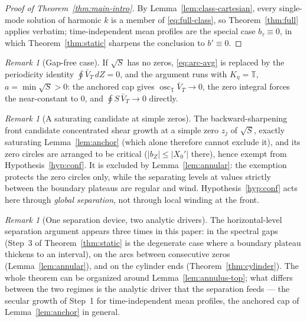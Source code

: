 \documentclass[11pt]{amsart}
\theoremstyle{definition}
\theoremstyle{remark}
\newtheorem{remark}[theorem]{Remark}
\newcommand{\T}{\mathbb{T}}
\DeclareMathOperator{\osc}{osc}
\begin{document}
\begin{proof}[Proof of Theorem~\textup{\ref{thm:main-intro}}]
By Lemma~\ref{lem:class-cartesian}, every single-mode solution of
harmonic $k$ is a member of \eqref{eq:full-class}, so
Theorem~\ref{thm:full} applies verbatim; time-independent mean profiles
are the special case $b_\tau\equiv0$, in which
Theorem~\ref{thm:static} sharpens the conclusion to $b'\equiv0$.
\end{proof}

\begin{remark}[Gap-free case]\label{rem:gapfree}
If $\sqrt S$ has no zeros, \eqref{eq:arc-avg} is replaced by the
periodicity identity $\oint\bar V_T\,dZ=0$, and the argument runs with
$K_\eta=\T$, $a=\min\sqrt S>0$: the anchored cap gives
$\osc_\T\bar V_T\to0$, the zero integral forces the near-constant to
$0$, and $\oint S\,\bar V_T\to0$ directly.
\end{remark}

\begin{remark}[A saturating candidate at simple zeros]
\label{rem:saturating}
The backward-sharpening front candidate concentrated shear growth at a
simple zero $z_j$ of $\sqrt S$, exactly saturating
Lemma~\ref{lem:anchor} (which alone therefore cannot exclude it), and
its zero circles are arranged to be critical ($|b_Z|\le|X_0'|$ there), hence exempt from
Hypothesis~\ref{hyp:conf}. It is excluded by Lemma~\ref{lem:annular}:
the exemption protects the zero circles only, while the separating
levels at values strictly between the boundary plateaus are regular and
wind. Hypothesis~\ref{hyp:conf} acts here through \emph{global
separation}, not through local winding at the front.
\end{remark}

\begin{remark}[One separation device, two analytic drivers]
\label{rem:unified}
The horizontal-level separation argument appears three times in
this paper: in the spectral gaps (Step~3 of Theorem~\ref{thm:static} is
the degenerate case where a boundary plateau thickens to an interval),
on the arcs between consecutive zeros (Lemma~\ref{lem:annular}), and on
the cylinder ends (Theorem~\ref{thm:cylinder}). The whole theorem can
be organized around Lemma~\ref{lem:annulus-top}; what differs between
the two regimes is the analytic driver that the separation feeds ---
the secular growth of Step~1 for time-independent mean profiles, the
anchored cap of Lemma~\ref{lem:anchor} in general.
\end{remark}
\end{document}
